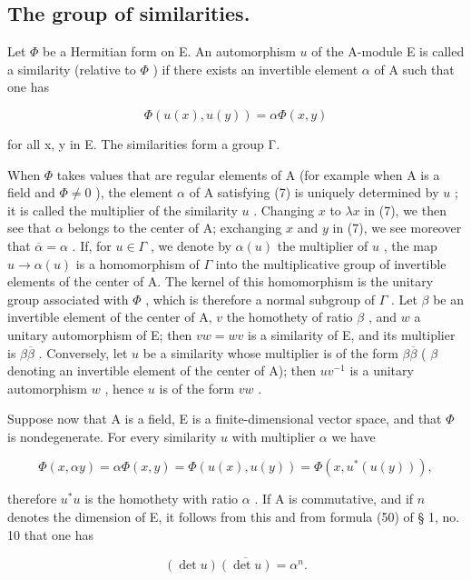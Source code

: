 \subsection{The group of similarities.}

Let \(\Phi\) be a Hermitian form on E. An automorphism \(u\) of the A-module E is called a similarity (relative to \(\Phi\) ) if there exists an invertible element \(\alpha\) of A such that one has

\[
\Phi (u (x), u (y)) = \alpha \Phi (x, y)\tag{7}
\]

for all x, y in E. The similarities form a group Γ.

When \(\Phi\) takes values that are regular elements of A (for example when A is a field and \(\Phi \neq 0\) ), the element \(\alpha\) of A satisfying (7) is uniquely determined by \(u\) ; it is called the multiplier of the similarity \(u\) . Changing \(x\) to \(\lambda x\) in (7), we then see that \(\alpha\) belongs to the center of A; exchanging \(x\) and \(y\) in (7), we see moreover that \(\overline{\alpha} = \alpha\) . If, for \(u \in \Gamma\) , we denote by \(\alpha(u)\) the multiplier of \(u\) , the map \(u \to \alpha(u)\) is a homomorphism of \(\Gamma\) into the multiplicative group of invertible elements of the center of A. The kernel of this homomorphism is the unitary group associated with \(\Phi\) , which is therefore a normal subgroup of \(\Gamma\) . Let \(\beta\) be an invertible element of the center of A, \(v\) the homothety of ratio \(\beta\) , and \(w\) a unitary automorphism of E; then \(vw = wv\) is a similarity of E, and its multiplier is \(\beta\overline{\beta}\) . Conversely, let \(u\) be a similarity whose multiplier is of the form \(\beta\overline{\beta}\) ( \(\beta\) denoting an invertible element of the center of A); then \(uv^{-1}\) is a unitary automorphism \(w\) , hence \(u\) is of the form \(vw\) .

Suppose now that A is a field, E is a finite-dimensional vector space, and that \(\Phi\) is nondegenerate. For every similarity \(u\) with multiplier \(\alpha\) we have

\[
\Phi (x, \alpha y) = \alpha \Phi (x, y) = \Phi (u (x), u (y)) = \Phi (x, u ^ {*} (u (y))),
\]

therefore \(u^*u\) is the homothety with ratio \(\alpha\) . If A is commutative, and if \(n\) denotes the dimension of E, it follows from this and from formula (50) of § 1, no. 10 that one has

\[
(\det u) \overline {{(\det u)}} = \alpha^ {n}.\tag{8}
\]

